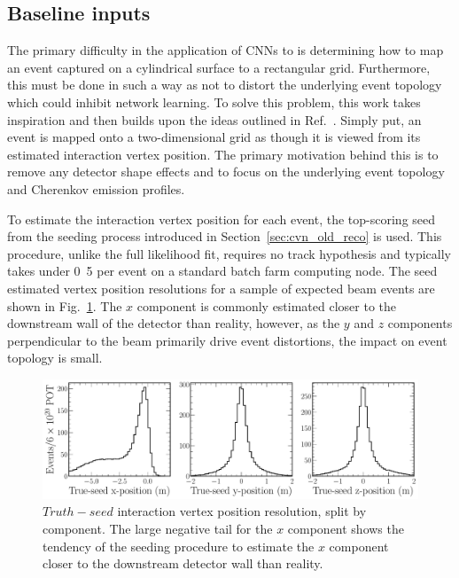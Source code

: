 \subsection{Baseline inputs} %
\label{sec:cvn_baseline_inputs} %

The primary difficulty in the application of CNNs to \chips is determining how to map an event
captured on a cylindrical surface to a rectangular grid. Furthermore, this must be done in such a
way as not to distort the underlying event topology which could inhibit network learning. To solve
this problem, this work takes inspiration and then builds upon the ideas outlined in
Ref.~\cite{theodore2016}. Simply put, an event is mapped onto a two-dimensional grid as though it
is viewed from its estimated interaction vertex position. The primary motivation behind this is to
remove any detector shape effects and to focus on the underlying event topology and Cherenkov
emission profiles.

To estimate the interaction vertex position for each event, the top-scoring seed from the seeding
process introduced in Section~\ref{sec:cvn_old_reco} is used. This procedure, unlike the full
likelihood fit, requires no track hypothesis and typically takes under
\unit{0.5}{} per event on a standard batch farm computing node. The seed estimated
vertex position resolutions for a sample of expected beam events are shown in
Fig.~\ref{fig:explore_true_reco_vtx}. The $x$ component is commonly estimated closer to the
downstream wall of the detector than reality, however, as the $y$ and $z$ components perpendicular
to the beam primarily drive event distortions, the impact on event topology is small.

\begin{figure} %
    \includegraphics[width=\textwidth]{diagrams/6-cvn/chipsnet/explore_true_reco_vtx.pdf}
    \caption[Seed interaction vertex resolutions.]
    {$Truth - seed$ interaction vertex position resolution, split by component. The large negative
        tail for the $x$ component shows the tendency of the seeding procedure to estimate the $x$
        component closer to the downstream detector wall than reality.}
    \label{fig:explore_true_reco_vtx}
\end{figure}

